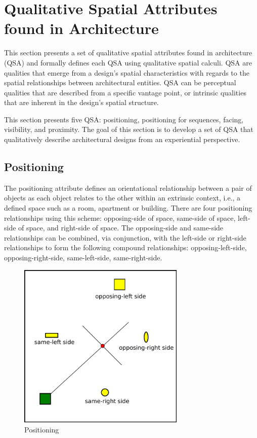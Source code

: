 \documentclass[12pt]{ucthesis}
\begin{document}
\section{Qualitative Spatial Attributes found in Architecture}
This section presents a set of qualitative spatial attributes found in architecture (QSA) and formally defines each QSA using qualitative spatial calculi. QSA are qualities that emerge from a design's spatial characteristics with regards to the spatial relationships between architectural entities. QSA can be perceptual qualities that are described from a specific vantage point, or intrinsic qualities that are inherent in the design's spatial structure. 

This section presents five QSA: positioning, positioning for sequences, facing, visibility, and proximity. The goal of this section is to develop a set of QSA that qualitatively describe architectural designs from an experiential perspective. %

\subsection{Positioning}
The positioning attribute defines an orientational relationship between a pair of objects as each object relates to the other within an extrinsic context, i.e., a defined space such as a room, apartment or building. There are four positioning relationships using this scheme: opposing-side of space, same-side of space, left-side of space, and right-side of space. The opposing-side and same-side relationships can be combined, via conjunction, with the left-side or right-side relationships to form the following compound relationships: opposing-left-side, opposing-right-side, same-left-side, same-right-side.

\begin{figure}[H]
\centering
\includegraphics[width=80mm]{position}
\caption{Positioning}
\label{position}
\end{figure}
\end{document}
